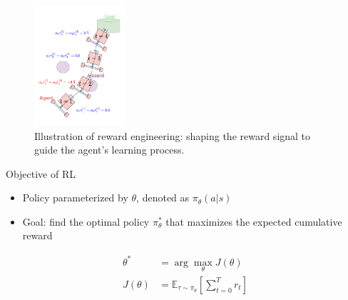 \documentclass[8pt, aspectratio=169]{beamer} %
\begin{document}

\begin{frame}{\insertsubsectionhead}

  \begin{figure}
    \includegraphics[width=0.3\textwidth]{figures/reward-engineering.pdf}
    \caption{Illustration of reward engineering: shaping the reward signal to guide the agent's learning process.}
  \end{figure}

\end{frame}


\begin{frame}{\insertsubsectionhead}{Objective of RL}
  \begin{itemize}
    \item Policy parameterized by $\theta$, denoted as $\pi_\theta(a|s)$
    \item Goal: find the optimal policy $\pi^*_\theta$ that maximizes the expected cumulative reward
  \end{itemize}

  \begin{equation}
    \begin{aligned}
      \theta^* &= \arg\max_\theta J(\theta) \\
      J(\theta) &= \mathbb{E}_{\tau \sim \pi_\theta} \left[\sum^T_{t = 0} r_t \right]
    \end{aligned}
  \end{equation}

\end{frame}
\end{document}
